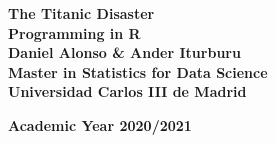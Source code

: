 \documentclass[a4paper,12pt]{article}
\begin{document}
	
		\begin{titlepage}
		\begin{center}
		\textbf{\LARGE The Titanic Disaster}\\[0.5 cm]
		\textbf{\LARGE Programming in R}\\[5 cm]
        \textbf{\large Daniel Alonso \& Ander Iturburu}\\[0.1cm]
        \textbf{\large Master in Statistics for Data Science}\\[0.1 cm]
        \textbf{\large Universidad Carlos III de Madrid}\\[1 cm]
        \begin{figure}[H]
		    \centering
		\end{figure}
		\textbf{Academic Year 2020/2021}    
		\end{center}
	    \end{titlepage} 

    
\end{document}
